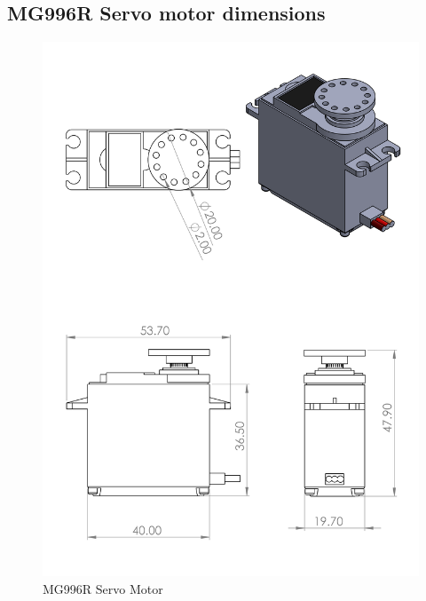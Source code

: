 \subsection{MG996R Servo motor dimensions}
\begin{figure}[H]
    \centering
    \includegraphics[height=.8\textheight, width=\textwidth]{Figures/ServoMotorAssembly.PNG}
    \caption{MG996R Servo Motor}
\end{figure}


